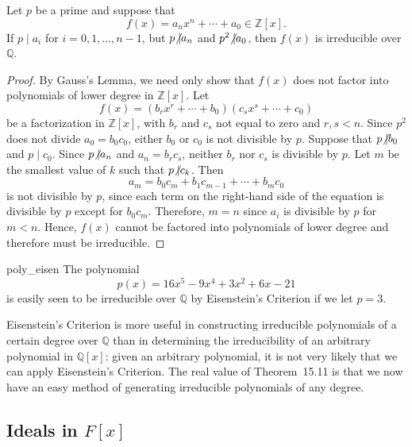 \begin{theorem}
Let $p$ be a prime and suppose that
$$
f(x) = a_n x^n + \cdots + a_0 \in {\mathbb Z}[x].
$$
If $p \mid a_i$ for $i = 0, 1, \ldots, n-1$, but $p {\not{\mid}} a_n$
and $p^2 {\not{\mid}} a_0$, then $f(x)$ is irreducible over ${\mathbb Q}$. 
\end{theorem}
 
 
\begin{proof}
By Gauss's Lemma, we need only show that $f(x)$ does not factor into
polynomials of lower degree in ${\mathbb Z}[x]$. Let  
$$
f(x) = (b_rx^r + \cdots + b_0)(c_s x^s + \cdots + c_0 )
$$
be a factorization in ${\mathbb Z}[x]$, with $b_r$ and $c_s$ not equal to
zero and $r, s < n$. Since $p^2$ does not divide $a_0 = b_0 c_0$,
either $b_0$ or $c_0$ is not divisible by $p$. Suppose that $p {\not{\mid}}
b_0$ and $p \mid c_0$. Since $p {\not{\mid}} a_n$ and $a_n = b_r c_s$,
neither $b_r$ nor $c_s$ is divisible by $p$. Let $m$ be the smallest
value of $k$ such that $p {\not{\mid}} c_k$. Then  
$$
a_m = b_0 c_m + b_1 c_{m-1} + \cdots + b_m c_0
$$
is not divisible by $p$, since each term on the right-hand side of the
equation is divisible by $p$ except for $b_0 c_m$.  Therefore, $m =n$
since $a_i$ is divisible by $p$ for $m < n$.  Hence, $f(x)$ cannot be
factored into polynomials of lower degree and therefore must be
irreducible. 
\end{proof}
 
 
\begin{example}{poly_eisen}
The polynomial
$$
p(x) = 16 x^5  -9 x^4 + 3x^2 + 6 x - 21
$$
is easily seen to be irreducible over ${\mathbb Q}$ by Eisenstein's
Criterion if we let $p = 3$.
\end{example}
 
 
\medskip
 
 
Eisenstein's Criterion is more useful in constructing irreducible
polynomials of a certain degree over ${\mathbb Q}$ than in determining the
irreducibility of an arbitrary polynomial in ${\mathbb Q}[x]$: given an
arbitrary polynomial, it is not very likely that we can apply
Eisenstein's Criterion.  The real value of Theorem~15.11 is that we now
have an easy method of generating irreducible polynomials of any
degree. 
 
 
 
\subsection*{Ideals in $F[x]$}
 
